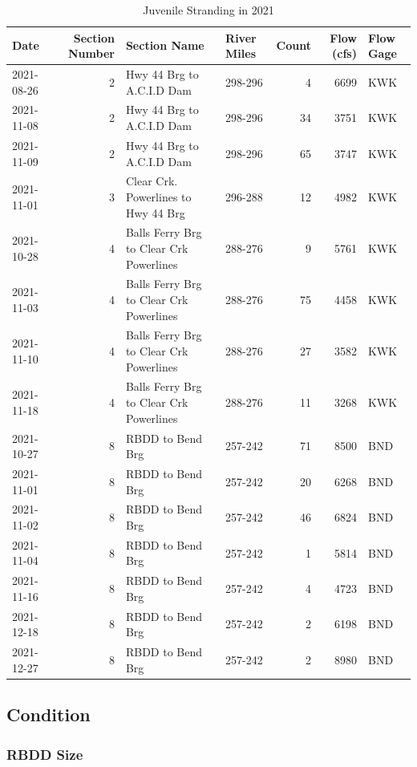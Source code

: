 \documentclass[
]{book}
\theoremstyle{definition}
\theoremstyle{definition}
\theoremstyle{definition}
\theoremstyle{definition}
\theoremstyle{remark}
\begin{document}
\begin{table}
\centering
\caption{Juvenile Stranding in 2021}
\centering
\begin{tabular}[t]{lrllrrl}
\hline
Date & Section Number & Section Name & River Miles & Count & Flow (cfs) & Flow Gage\\
\hline
2021-08-26 & 2 & Hwy 44 Brg to A.C.I.D Dam & 298-296 & 4 & 6699 & KWK\\
\hline
2021-11-08 & 2 & Hwy 44 Brg to A.C.I.D Dam & 298-296 & 34 & 3751 & KWK\\
\hline
2021-11-09 & 2 & Hwy 44 Brg to A.C.I.D Dam & 298-296 & 65 & 3747 & KWK\\
\hline
2021-11-01 & 3 & Clear Crk. Powerlines to Hwy 44 Brg & 296-288 & 12 & 4982 & KWK\\
\hline
2021-10-28 & 4 & Balls Ferry Brg to Clear Crk Powerlines & 288-276 & 9 & 5761 & KWK\\
\hline
2021-11-03 & 4 & Balls Ferry Brg to Clear Crk Powerlines & 288-276 & 75 & 4458 & KWK\\
\hline
2021-11-10 & 4 & Balls Ferry Brg to Clear Crk Powerlines & 288-276 & 27 & 3582 & KWK\\
\hline
2021-11-18 & 4 & Balls Ferry Brg to Clear Crk Powerlines & 288-276 & 11 & 3268 & KWK\\
\hline
2021-10-27 & 8 & RBDD to Bend Brg & 257-242 & 71 & 8500 & BND\\
\hline
2021-11-01 & 8 & RBDD to Bend Brg & 257-242 & 20 & 6268 & BND\\
\hline
2021-11-02 & 8 & RBDD to Bend Brg & 257-242 & 46 & 6824 & BND\\
\hline
2021-11-04 & 8 & RBDD to Bend Brg & 257-242 & 1 & 5814 & BND\\
\hline
2021-11-16 & 8 & RBDD to Bend Brg & 257-242 & 4 & 4723 & BND\\
\hline
2021-12-18 & 8 & RBDD to Bend Brg & 257-242 & 2 & 6198 & BND\\
\hline
2021-12-27 & 8 & RBDD to Bend Brg & 257-242 & 2 & 8980 & BND\\
\hline
\end{tabular}
\end{table}

\hypertarget{condition}{%
\subsection{Condition}\label{condition}}

\hypertarget{rbdd-size}{%
\subsubsection{RBDD Size}\label{rbdd-size}}
\end{document}
